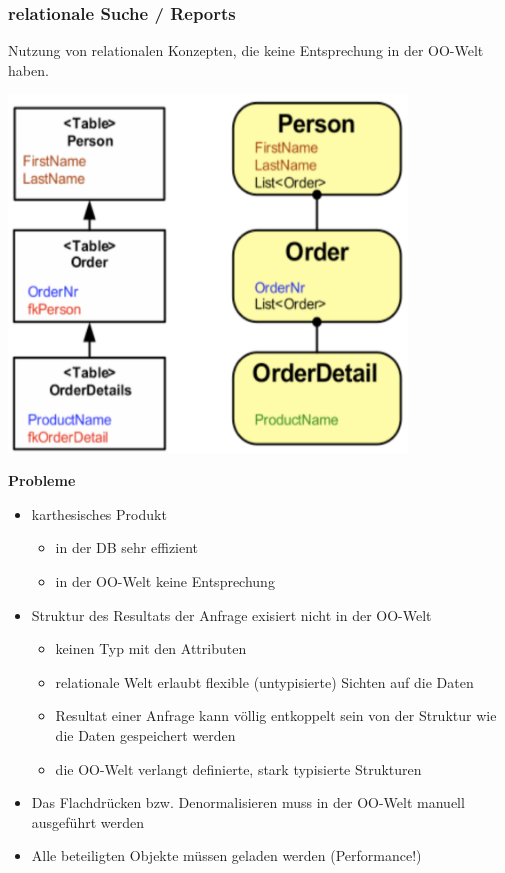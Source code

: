 \documentclass{report}
\newenvironment{Figure}
	{\par\medskip\noindent\minipage{\linewidth}}
	{\endminipage\par\medskip}
\theoremstyle{definition}
\theoremstyle{example}
\begin{document}
\subsubsection{relationale Suche / Reports}
Nutzung von relationalen Konzepten, die keine Entsprechung in der OO-Welt haben.

\begin{Figure}
\centering
\includegraphics[width=400px]{img/JPARelationaleSuche.png}
	\label{fig:Relationale / Reports}
\end{Figure}

\textbf{Probleme}\\
\begin{itemize}
	\item {karthesisches Produkt
		\begin{itemize}
			\item in der DB sehr effizient
			\item in der OO-Welt keine Entsprechung
		\end{itemize}
	}
	\item {Struktur des Resultats der Anfrage exisiert nicht in der OO-Welt
		\begin{itemize}
			\item keinen Typ mit den Attributen
			\item relationale Welt erlaubt flexible (untypisierte) Sichten auf die Daten
			\item Resultat einer Anfrage kann völlig entkoppelt sein von der Struktur wie die Daten gespeichert werden
			\item die OO-Welt verlangt definierte, stark typisierte Strukturen
		\end{itemize}
	}
	\item Das Flachdrücken bzw. Denormalisieren muss in der OO-Welt manuell ausgeführt werden
	\item Alle beteiligten Objekte müssen geladen werden (Performance!)
\end{itemize}
\end{document}
